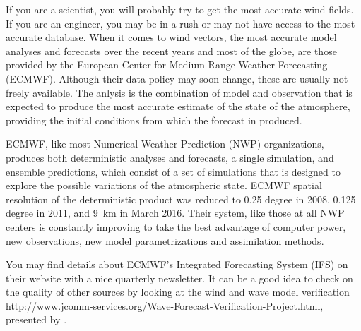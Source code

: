 If you are a scientist, you will probably try to get the most accurate wind fields. If you are an engineer, you may be in a rush or may not have 
access to the most accurate database. When it comes to wind vectors, the most accurate model analyses and forecasts over the recent years and 
most of the globe, are those provided by the European Center for Medium Range Weather Forecasting (ECMWF). 
Although their data policy may soon change, these are usually not freely available. The anlysis is the combination of model and observation that 
is expected to produce the most accurate estimate of the state of the atmosphere, providing the initial conditions from which the forecast in produced. 

ECMWF, like most Numerical Weather Prediction 
(NWP) organizations, produces both deterministic analyses and forecasts, a single simulation, and ensemble predictions, which consist of a set of 
simulations that is designed to explore the possible variations of the atmospheric state. ECMWF spatial resolution of the deterministic product 
was reduced to 0.25 degree in 2008,  0.125 
degree in 2011, and 9~km in March 2016. Their system, like those at all NWP centers is constantly improving to take the best advantage of computer power, 
new observations, new model parametrizations and assimilation methods. 

You may find details about ECMWF's Integrated Forecasting System (IFS) on their website with a nice quarterly newsletter. 
It can be a good idea to check on the quality of other sources by looking at the wind and wave model verification 
\href{http://www.jcomm-services.org/Wave-Forecast-Verification-Project.html}{\small{http://www.jcomm-services.org/Wave-Forecast-Verification-Project.html}}, 
presented by \cite{Bidlot2008}.

